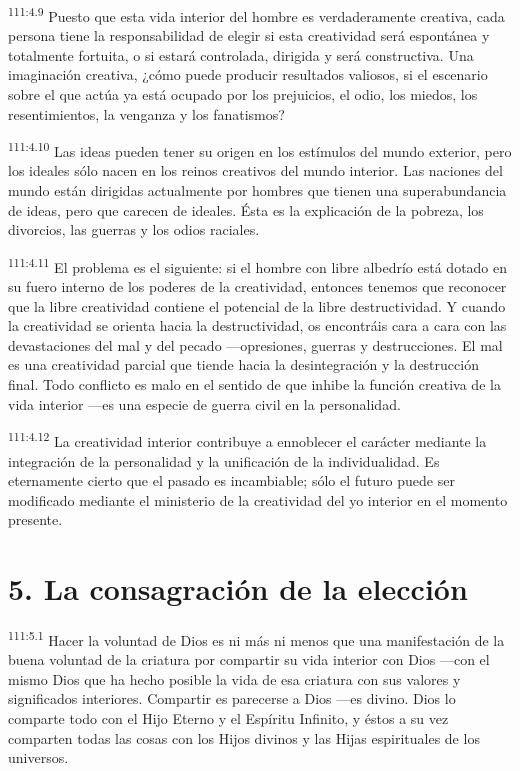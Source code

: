 \par
\textsuperscript{111:4.9} Puesto que esta vida interior del hombre es verdaderamente creativa, cada persona tiene la responsabilidad de elegir si esta creatividad será espontánea y totalmente fortuita, o si estará controlada, dirigida y será constructiva. Una imaginación creativa, ¿cómo puede producir resultados valiosos, si el escenario sobre el que actúa ya está ocupado por los prejuicios, el odio, los miedos, los resentimientos, la venganza y los fanatismos?

\par
\textsuperscript{111:4.10} Las ideas pueden tener su origen en los estímulos del mundo exterior, pero los ideales sólo nacen en los reinos creativos del mundo interior. Las naciones del mundo están dirigidas actualmente por hombres que tienen una superabundancia de ideas, pero que carecen de ideales. Ésta es la explicación de la pobreza, los divorcios, las guerras y los odios raciales.

\par
\textsuperscript{111:4.11} El problema es el siguiente: si el hombre con libre albedrío está dotado en su fuero interno de los poderes de la creatividad, entonces tenemos que reconocer que la libre creatividad contiene el potencial de la libre destructividad. Y cuando la creatividad se orienta hacia la destructividad, os encontráis cara a cara con las devastaciones del mal y del pecado ---opresiones, guerras y destrucciones. El mal es una creatividad parcial que tiende hacia la desintegración y la destrucción final. Todo conflicto es malo en el sentido de que inhibe la función creativa de la vida interior ---es una especie de guerra civil en la personalidad.

\par
\textsuperscript{111:4.12} La creatividad interior contribuye a ennoblecer el carácter mediante la integración de la personalidad y la unificación de la individualidad. Es eternamente cierto que el pasado es incambiable; sólo el futuro puede ser modificado mediante el ministerio de la creatividad del yo interior en el momento presente.

\section*{5. La consagración de la elección}
\par
\textsuperscript{111:5.1} Hacer la voluntad de Dios es ni más ni menos que una manifestación de la buena voluntad de la criatura por compartir su vida interior con Dios ---con el mismo Dios que ha hecho posible la vida de esa criatura con sus valores y significados interiores. Compartir es parecerse a Dios ---es divino. Dios lo comparte todo con el Hijo Eterno y el Espíritu Infinito, y éstos a su vez comparten todas las cosas con los Hijos divinos y las Hijas espirituales de los universos.

